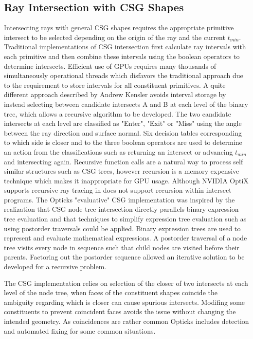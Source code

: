 \documentclass{webofc}
\begin{document}
\subsection{Ray Intersection with CSG Shapes}
\label{intersection}
%
Intersecting rays with general CSG shapes requires the appropriate primitive intersect to be 
selected depending on the origin of the ray and the current $t_{min}$. Traditional implementations of CSG intersection first calculate 
ray intervals with each primitive and then combine these intervals using the boolean operators to determine intersects.  
Efficient use of GPUs requires many thousands of simultaneously operational threads which disfavors the traditional approach due to 
the requirement to store intervals for all constituent primitives.  A quite different approach
described by Andrew Kensler\cite{kensler} avoids interval storage by instead selecting between 
candidate intersects A and B at each level of the binary tree, which allows a recursive algorithm 
to be developed. The two candidate intersects at each level are classified as "Enter", "Exit" or "Miss" 
using the angle between the ray direction and surface normal. Six decision tables corresponding to which side is closer and 
to the three boolean operators are used to determine an action from the classifications such as returning an intersect 
or advancing $t_{min}$ and intersecting again. 
Recursive function calls are a natural way to process self similar structures such as CSG trees,  
however recursion is a memory expensive technique which makes it inappropriate for GPU usage.
Although NVIDIA OptiX supports recursive ray tracing in does not support recursion within intersect programs. 
The Opticks "evaluative" CSG implementation was inspired by the realization that CSG node tree intersection 
directly parallels binary expression tree evaluation and that techniques to simplify expression 
tree evaluation such as using postorder traversals could be applied. 
Binary expression trees are used to represent and evaluate mathematical expressions. 
A postorder traversal of a node tree visits every node in sequence such that
child nodes are visited before their parents.
Factoring out the postorder sequence allowed an iterative solution to be developed 
for a recursive problem.  

The CSG implementation relies on selection of the closer of two intersects at each level 
of the node tree, when faces of the constituent shapes coincide the ambiguity regarding which is closer
can cause spurious intersects. Modifing some constituents to prevent coincident faces avoids 
the issue without changing the intended geometry. As coincidences are rather common Opticks includes 
detection and automated fixing for some common situations.        
%
\end{document}
